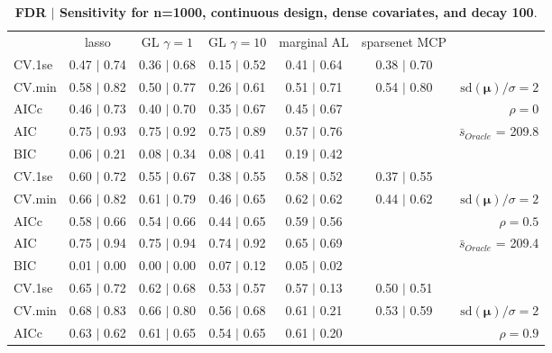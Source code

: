 \clearpage
\begin{table}\vspace{-.5cm}
\caption[l]{ {\it }
{ \bf FDR $\boldsymbol{\mid}$ Sensitivity for n=1000, continuous design, dense covariates, and  decay  100}.}
\vspace{-.5cm}
\footnotesize{}
\begin{center}
\begin{tabular}{l*{5}{c}|r}
 & lasso & GL $\gamma=1$ & GL $\gamma=10$ & marginal AL & sparsenet MCP  & \\
 \cline{1-7}
CV.1se & 0.47 $\mid$ 0.74 & 0.36 $\mid$ 0.68 & 0.15 $\mid$ 0.52 & 0.41 $\mid$ 0.64 & 0.38 $\mid$ 0.70 & \\
CV.min & 0.58 $\mid$ 0.82 & 0.50 $\mid$ 0.77 & 0.26 $\mid$ 0.61 & 0.51 $\mid$ 0.71 & 0.54 $\mid$ 0.80 &  $\mathrm{sd}(\mathbf{\mu})/\sigma=2$ \\
AICc & 0.46 $\mid$ 0.73 & 0.40 $\mid$ 0.70 & 0.35 $\mid$ 0.67 & 0.45 $\mid$ 0.67 & & $\rho=0$ \\
AIC & 0.75 $\mid$ 0.93 & 0.75 $\mid$ 0.92 & 0.75 $\mid$ 0.89 & 0.57 $\mid$ 0.76 & &  \multirow{2}{*}{$\bar{s}_{Oracle}$ = 209.8} \\
BIC & 0.06 $\mid$ 0.21 & 0.08 $\mid$ 0.34 & 0.08 $\mid$ 0.41 & 0.19 $\mid$ 0.42 & &  \\
 \hline 
CV.1se & 0.60 $\mid$ 0.72 & 0.55 $\mid$ 0.67 & 0.38 $\mid$ 0.55 & 0.58 $\mid$ 0.52 & 0.37 $\mid$ 0.55 & \\
CV.min & 0.66 $\mid$ 0.82 & 0.61 $\mid$ 0.79 & 0.46 $\mid$ 0.65 & 0.62 $\mid$ 0.62 & 0.44 $\mid$ 0.62 &  $\mathrm{sd}(\mathbf{\mu})/\sigma=2$ \\
AICc & 0.58 $\mid$ 0.66 & 0.54 $\mid$ 0.66 & 0.44 $\mid$ 0.65 & 0.59 $\mid$ 0.56 & & $\rho=0.5$ \\
AIC & 0.75 $\mid$ 0.94 & 0.75 $\mid$ 0.94 & 0.74 $\mid$ 0.92 & 0.65 $\mid$ 0.69 & &  \multirow{2}{*}{$\bar{s}_{Oracle}$ = 209.4} \\
BIC & 0.01 $\mid$ 0.00 & 0.00 $\mid$ 0.00 & 0.07 $\mid$ 0.12 & 0.05 $\mid$ 0.02 & &  \\
 \hline 
CV.1se & 0.65 $\mid$ 0.72 & 0.62 $\mid$ 0.68 & 0.53 $\mid$ 0.57 & 0.57 $\mid$ 0.13 & 0.50 $\mid$ 0.51 & \\
CV.min & 0.68 $\mid$ 0.83 & 0.66 $\mid$ 0.80 & 0.56 $\mid$ 0.68 & 0.61 $\mid$ 0.21 & 0.53 $\mid$ 0.59 &  $\mathrm{sd}(\mathbf{\mu})/\sigma=2$ \\
AICc & 0.63 $\mid$ 0.62 & 0.61 $\mid$ 0.65 & 0.54 $\mid$ 0.65 & 0.61 $\mid$ 0.20 & & $\rho=0.9$ \\

\end{tabular}
\end{center}
\end{table}
